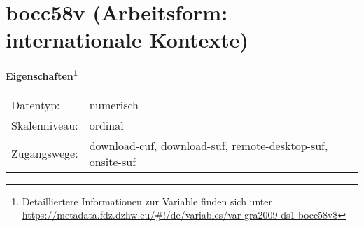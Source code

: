 
    \setcounter{footnote}{0}

    \vspace*{-1.8cm}
	\section{bocc58v (Arbeitsform: internationale Kontexte)}
	\label{section:bocc58v}



    \vspace*{0.5cm}
    \noindent\textbf{Eigenschaften\footnote{Detailliertere Informationen zur Variable finden sich unter
		\url{https://metadata.fdz.dzhw.eu/\#!/de/variables/var-gra2009-ds1-bocc58v$}}}\\
	\begin{tabularx}{\hsize}{@{}lX}
	Datentyp: & numerisch \\
	Skalenniveau: & ordinal \\
	Zugangswege: &
	  download-cuf, 
	  download-suf, 
	  remote-desktop-suf, 
	  onsite-suf
 \\
    \end{tabularx}



